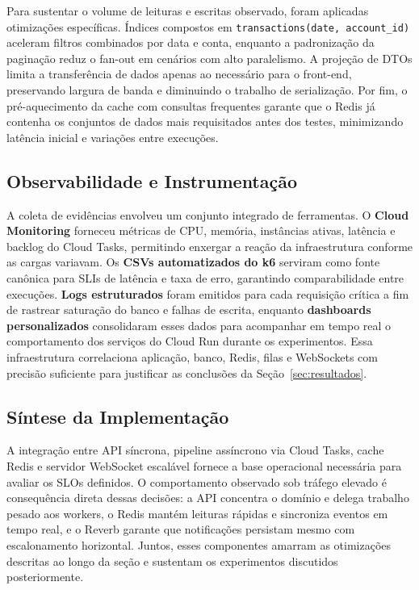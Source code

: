 Para sustentar o volume de leituras e escritas observado, foram aplicadas otimizações
específicas. Índices compostos em \verb|transactions(date, account_id)| aceleram
filtros combinados por data e conta, enquanto a padronização da paginação reduz o
fan-out em cenários com alto paralelismo. A projeção de DTOs limita a transferência
de dados apenas ao necessário para o front-end, preservando largura de banda e diminuindo
o trabalho de serialização. Por fim, o pré-aquecimento da cache com consultas frequentes
garante que o Redis já contenha os conjuntos de dados mais requisitados antes dos testes,
minimizando latência inicial e variações entre execuções.

\subsection{Observabilidade e Instrumentação}

A coleta de evidências envolveu um conjunto integrado de ferramentas. O \textbf{Cloud Monitoring}
forneceu métricas de CPU, memória, instâncias ativas, latência e backlog do Cloud Tasks,
permitindo enxergar a reação da infraestrutura conforme as cargas variavam.
Os \textbf{CSVs automatizados do k6} serviram como fonte canônica para SLIs de latência
e taxa de erro, garantindo comparabilidade entre execuções. \textbf{Logs estruturados}
foram emitidos para cada requisição crítica a fim de rastrear saturação do banco e falhas de escrita,
enquanto \textbf{dashboards personalizados} consolidaram esses dados para acompanhar
em tempo real o comportamento dos serviços do Cloud Run durante os experimentos.
Essa infraestrutura correlaciona aplicação, banco, Redis, filas e WebSockets com precisão
suficiente para justificar as conclusões da Seção~\ref{sec:resultados}.

\subsection{Síntese da Implementação}

A integração entre API síncrona, pipeline assíncrono via Cloud Tasks, cache Redis
e servidor WebSocket escalável fornece a base operacional necessária para avaliar
os SLOs definidos. O comportamento observado sob tráfego elevado é consequência direta
dessas decisões: a API concentra o domínio e delega trabalho pesado aos workers,
o Redis mantém leituras rápidas e sincroniza eventos em tempo real, e o Reverb garante
que notificações persistam mesmo com escalonamento horizontal. Juntos, esses componentes
amarram as otimizações descritas ao longo da seção e sustentam os experimentos discutidos posteriormente.
